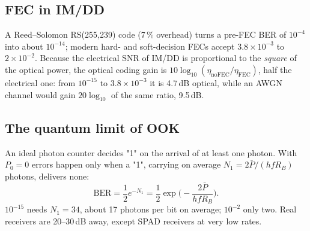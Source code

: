 \subsection{FEC in IM/DD}
A Reed--Solomon RS(255,239) code (7\,\% overhead) turns a pre-FEC BER of $10^{-4}$ into about $10^{-14}$;
modern hard- and soft-decision FECs accept $3.8\times10^{-3}$ to $2\times10^{-2}$. Because the electrical SNR of
IM/DD is proportional to the \emph{square} of the optical power, the optical coding gain is
$10\log_{10}(\eta_{\mathrm{noFEC}}/\eta_{\mathrm{FEC}})$, half the electrical one: from $10^{-15}$ to $3.8\times10^{-3}$ it is
4.7\,dB optical, while an AWGN channel would gain $20\log_{10}$ of the same ratio, 9.5\,dB.

\subsection{The quantum limit of OOK}
An ideal photon counter decides "1" on the arrival of at least one photon. With $P_0=0$ errors
happen only when a "1", carrying on average $N_1=2\bar P/(hfR_B)$ photons, delivers none:
\begin{equation}
  \mathrm{BER}=\frac12e^{-N_1}=\frac12\exp\Big(-\frac{2\bar P}{hfR_B}\Big).
\end{equation}
$10^{-15}$ needs $N_1=34$, about 17 photons per bit on average; $10^{-2}$ only two. Real receivers are
20--30\,dB away, except SPAD receivers at very low rates.


